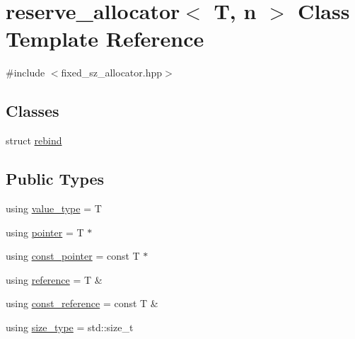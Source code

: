 \hypertarget{classreserve__allocator}{}\section{reserve\+\_\+allocator$<$ T, n $>$ Class Template Reference}
\label{classreserve__allocator}


{\ttfamily \#include $<$fixed\+\_\+sz\+\_\+allocator.\+hpp$>$}

\subsection*{Classes}
\begin{DoxyCompactItemize}
\item 
struct \hyperlink{structreserve__allocator_1_1rebind}{rebind}
\end{DoxyCompactItemize}
\subsection*{Public Types}
\begin{DoxyCompactItemize}
\item 
using \hyperlink{classreserve__allocator_a594a205f33e6b52110f5516b11d584f6}{value\+\_\+type} = T
\item 
using \hyperlink{classreserve__allocator_a5381e084c053670fcbcc13f1a8724a75}{pointer} = T $\ast$
\item 
using \hyperlink{classreserve__allocator_a258a73c5b6817b44358fab32cc8f37f4}{const\+\_\+pointer} = const T $\ast$
\item 
using \hyperlink{classreserve__allocator_a260b28f64b11d2c4af92d685343e074c}{reference} = T \&
\item 
using \hyperlink{classreserve__allocator_a6e81b567aee2879382a0baebba111c2a}{const\+\_\+reference} = const T \&
\item 
using \hyperlink{classreserve__allocator_acaf9251a99c55feadccf2bb894db4f4f}{size\+\_\+type} = std\+::size\+\_\+t
\end{DoxyCompactItemize}
